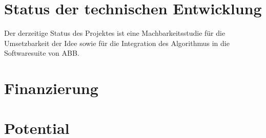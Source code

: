 
\section{Status der technischen Entwicklung}

Der derzeitige Status des Projektes ist eine Machbarkeitsstudie für die Umsetzbarkeit der Idee sowie für die Integration des Algorithmus in die Softwaresuite von ABB.

\section{Finanzierung}



\section{Potential}



\blindtext
\newpage
\blindtext